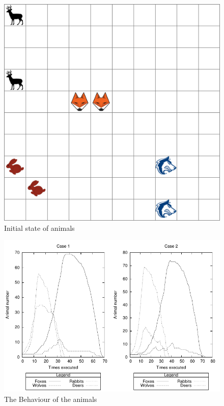 \documentclass[11pt]{article}
\begin{document}
{
	\begin{figure}[here]
	\centering
	\includegraphics[scale=.65]{init.png}
	\caption{Initial state of animals}
	\label{fig:initialState}
	\end{figure}
}

{
	\begin{figure}[p]
	\centering
	\includegraphics{plots.pdf}
	\caption{The Behaviour of the animals}
	\label{fig:animalBehaviour}
	\end{figure}
}
\end{document}
